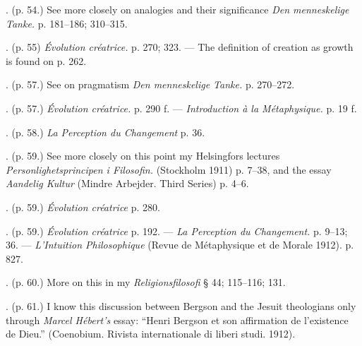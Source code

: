 \documentclass[12pt,a4paper,openany]{book}
\newcommand{\opage}[1]{\marginnote{\footnotesize\textit{[#1]}}}
\newcommand{\notelabel}[1]{\noindent #1}
\begin{document}
\begin{small}
\notelabel{43.} (p. 54.) See more closely on analogies and their significance \textit{Den menneskelige Tanke.} p. 181--186; 310--315.

\opage{70}\notelabel{44.} (p. 55) \textit{Évolution créatrice.} p. 270; 323. --- The definition of creation as growth is found on p. 262. %

\notelabel{45.} (p. 57.) See on pragmatism \textit{Den menneskelige Tanke.} p. 270--272.

\notelabel{46.} (p. 57.) \textit{Évolution créatrice.} p. 290 f. --- \textit{Introduction à la Métaphysique.} p. 19 f.

\notelabel{47.} (p. 58.) \textit{La Perception du Changement} p. 36.

\notelabel{48.} (p. 59.) See more closely on this point my Helsingfors lectures \textit{Personlighetsprincipen i Filosofin.} (Stockholm 1911) p. 7--38, and the essay \textit{Aandelig Kultur} (Mindre Arbejder. Third Series) p. 4--6.

\notelabel{49.} (p. 59.) \textit{Évolution créatrice} p. 280.

\notelabel{50.} (p. 59.) \textit{Évolution créatrice} p. 192. --- \textit{La Perception du Changement.} p. 9--13; 36. --- \textit{L'Intuition Philosophique} (Revue de Métaphysique et de Morale 1912). p. 827.

\notelabel{51.} (p. 60.) More on this in my \textit{Religionsfilosofi} \S{} 44; 115--116; 131.

\notelabel{52.} (p. 61.) I know this discussion between Bergson and the Jesuit theologians only through \emph{Marcel Hébert's} essay: ``Henri Bergson et son affirmation de l'existence de Dieu.'' (Coenobium. Rivista internationale di liberi studi. 1912).

\end{small}
\end{document}
